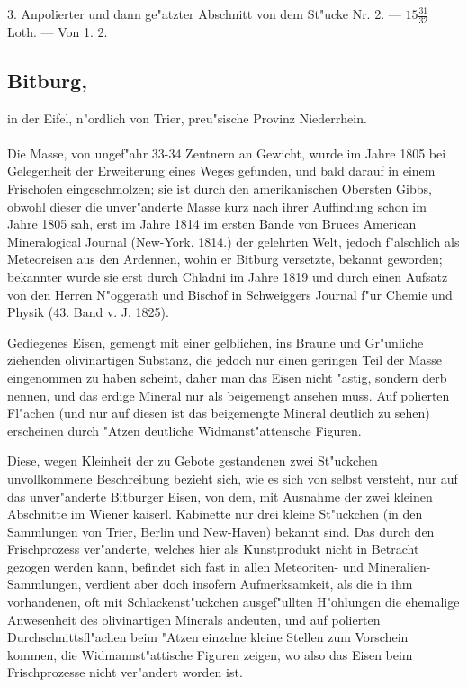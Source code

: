 \documentclass[a4paper, 11pt, oneside, polutonikogreek, german]{article}
\begin{document}
3. Anpolierter und dann ge"atzter Abschnitt von dem St"ucke Nr. 2. --- $15\frac{31}{32}$ Loth. --- Von 1. 2.
\subsection[Bitburg.]{Bitburg,}
\begin{center}
\small
in der Eifel, n"ordlich von Trier, preu"sische Provinz Niederrhein.
\end{center}
\paragraph{}
Die Masse, von ungef"ahr 33-34 Zentnern an Gewicht, wurde im Jahre 1805 bei Gelegenheit der Erweiterung eines Weges gefunden, und bald darauf in einem Frischofen eingeschmolzen; sie ist durch den amerikanischen Obersten Gibbs, obwohl dieser die unver"anderte Masse kurz nach ihrer Auffindung schon im Jahre 1805 sah, erst im Jahre 1814 im ersten Bande von Bruces American Mineralogical Journal (New-York. 1814.) der gelehrten Welt, jedoch f"alschlich als Meteoreisen aus den Ardennen, wohin er Bitburg versetzte, bekannt geworden; bekannter wurde sie erst durch Chladni im Jahre 1819 und durch einen Aufsatz von den Herren N"oggerath und Bischof in Schweiggers Journal f"ur Chemie und Physik (43. Band v. J. 1825).

Gediegenes Eisen, gemengt mit einer gelblichen, ins Braune und Gr"unliche ziehenden olivinartigen Substanz, die jedoch nur einen geringen Teil der Masse eingenommen zu haben scheint, daher man das Eisen nicht "astig, sondern derb nennen, und das erdige Mineral nur als beigemengt ansehen muss. Auf polierten Fl"achen (und nur auf diesen ist das beigemengte Mineral deutlich zu sehen) erscheinen durch "Atzen deutliche Widmanst"attensche Figuren.

Diese, wegen Kleinheit der zu Gebote gestandenen zwei St"uckchen unvollkommene Beschreibung bezieht sich, wie es sich von selbst versteht, nur auf das unver"anderte Bitburger Eisen, von dem, mit Ausnahme der zwei kleinen Abschnitte im Wiener kaiserl. Kabinette nur drei kleine St"uckchen (in den Sammlungen von Trier, Berlin und New-Haven) bekannt sind. Das durch den Frischprozess ver"anderte, welches hier als Kunstprodukt nicht in Betracht gezogen werden kann, befindet sich fast in allen Meteoriten- und Mineralien-Sammlungen, verdient aber doch insofern Aufmerksamkeit, als die in ihm vorhandenen, oft mit Schlackenst"uckchen ausgef"ullten H"ohlungen die ehemalige Anwesenheit des olivinartigen Minerals andeuten, und auf polierten Durchschnittsfl"achen beim "Atzen einzelne kleine Stellen zum Vorschein kommen, die Widmannst"attische Figuren zeigen, wo also das Eisen beim Frischprozesse nicht ver"andert worden ist.
\end{document}
